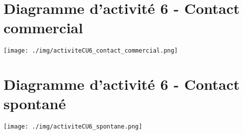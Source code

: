 \section{Diagramme d'activité 6 - Contact commercial}
\texttt{[image: ./img/activiteCU6\_contact\_commercial.png]}

\section{Diagramme d'activité 6 - Contact spontané}
\texttt{[image: ./img/activiteCU6\_spontane.png]}
